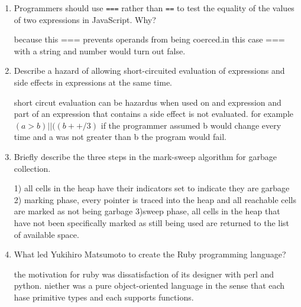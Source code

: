 \begin{enumerate}
  \item Programmers should use \verb+===+ rather than \verb+==+ to
    test the equality of the values of two expressions in JavaScript. Why?

  \begin{answer}

    because this === prevents operands from being coerced.in this case
    === with a string and number would turn out false.

    \end{answer}

  \item Describe a hazard of allowing short-circuited evaluation
    of expressions and side effects in expressions at the same time.

  \begin{answer}

   short circut evaluation can be hazardus when used on and expression
   and part of an expression that contains a side effect is not
   evaluated.  for example $(a > b) || ((b++ / 3)$ if the programmer
   assumed b would change every time and a was not greater than b the
   program would fail.

    \end{answer}

  \item Briefly describe the three steps in the mark-sweep algorithm
    for garbage collection.

  \begin{answer}

  1) all cells in the heap have their indicators set to indicate they
  are garbage 2) marking phase, every pointer is traced into the heap
  and all reachable cells are marked as not being garbage 3)sweep
  phase, all cells in the heap that have not been specifically marked
  as still being used are returned to the list of available space.

    \end{answer}

  \item What led Yukihiro Matsumoto to create the Ruby programming language?

  \begin{answer}

   the motivation for ruby was dissatisfaction of its designer with
   perl and python.  niether was a pure object-oriented language in
   the sense that each hase primitive types and each supports
   functions.


\end{answer}
\end{enumerate}
